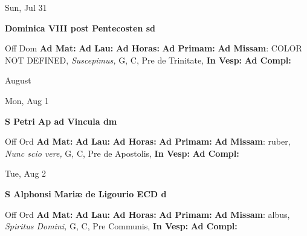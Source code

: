 \documentclass[10pt]{memoir}
\begin{document}
\begin{center}
\begin{minipage}{3.5in}
\vspace{2em}
\begin{center}Sun, Jul 31
\end{center}
\textbf{ \large Dominica VIII post Pentecosten
\textnormal{\normalsize sd}}

\begin{justify}Off Dom
\textbf{Ad Mat: }
\textbf{Ad Lau: }
\textbf{Ad Horas: }
\textbf{Ad Primam: }\textbf{Ad Missam}: COLOR NOT DEFINED, \textit{Suscepimus,} G, C, Pre de Trinitate, 
\textbf{In Vesp: }
\textbf{Ad Compl: }
\end{justify}
\end{minipage}
\end{center}

\begin{center}
\pagebreak
\thispagestyle{empty}
{\Huge August}
\end{center}
                    
\begin{center}
\begin{minipage}{3.5in}
\vspace{2em}
\begin{center}Mon, Aug 1
\end{center}
\textbf{ \large S Petri Ap ad Vincula
\textnormal{\normalsize dm}}

\begin{justify}Off Ord
\textbf{Ad Mat: }
\textbf{Ad Lau: }
\textbf{Ad Horas: }
\textbf{Ad Primam: }\textbf{Ad Missam}: ruber, \textit{Nunc scio vere,} G, C, Pre de Apostolis, 
\textbf{In Vesp: }
\textbf{Ad Compl: }
\end{justify}
\end{minipage}
\end{center}

\begin{center}
\begin{minipage}{3.5in}
\vspace{2em}
\begin{center}Tue, Aug 2
\end{center}
\textbf{ \large S Alphonsi Mariæ de Ligourio ECD
\textnormal{\normalsize d}}

\begin{justify}Off Ord
\textbf{Ad Mat: }
\textbf{Ad Lau: }
\textbf{Ad Horas: }
\textbf{Ad Primam: }\textbf{Ad Missam}: albus, \textit{Spiritus Domini,} G, C, Pre Communis, 
\textbf{In Vesp: }
\textbf{Ad Compl: }
\end{justify}
\end{minipage}
\end{center}
\end{document}
